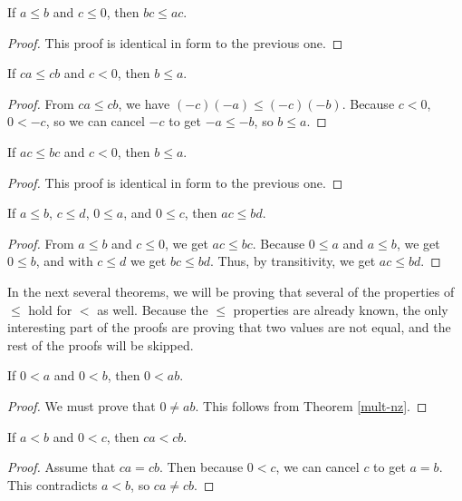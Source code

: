 \documentclass[../math.tex]{subfiles}
\begin{document}
\begin{theorem} \label{le-rmult-neg}
    If $a \leq b$ and $c \leq 0$, then $bc \leq ac$.
\end{theorem}
\begin{proof}
    This proof is identical in form to the previous one.
\end{proof}

\begin{theorem} \label{le-mult-lcancel-neg}
    If $ca \leq cb$ and $c < 0$, then $b \leq a$.
\end{theorem}
\begin{proof}
    From $ca \leq cb$, we have $(-c)(-a) \leq (-c)(-b)$.  Because $c < 0$, $0 <
    -c$, so we can cancel $-c$ to get $-a \leq -b$, so $b \leq a$.
\end{proof}

\begin{theorem} \label{le-mult-rcancel-neg}
    If $ac \leq bc$ and $c < 0$, then $b \leq a$.
\end{theorem}
\begin{proof}
    This proof is identical in form to the previous one.
\end{proof}

\begin{theorem} \label{le-lrmult-pos}
    If $a \leq b$, $c \leq d$, $0 \leq a$, and $0 \leq c$, then $ac \leq bd$.
\end{theorem}
\begin{proof}
    From $a \leq b$ and $c \leq 0$, we get $ac \leq bc$.  Because $0 \leq a$ and
    $a \leq b$, we get $0 \leq b$, and with $c \leq d$ we get $bc \leq bd$.
    Thus, by transitivity, we get $ac \leq bd$.
\end{proof}

In the next several theorems, we will be proving that several of the properties
of $\leq$ hold for $<$ as well.  Because the $\leq$ properties are already
known, the only interesting part of the proofs are proving that two values are
not equal, and the rest of the proofs will be skipped.

\begin{theorem}
    If $0 < a$ and $0 < b$, then $0 < ab$.
\end{theorem}
\begin{proof}
    We must prove that $0 \neq ab$.  This follows from Theorem \ref{mult-nz}.
\end{proof}

\begin{theorem}
    If $a < b$ and $0 < c$, then $ca < cb$.
\end{theorem}
\begin{proof}
    Assume that $ca = cb$.  Then because $0 < c$, we can cancel $c$ to get $a =
    b$.  This contradicts $a < b$, so $ca \neq cb$.
\end{proof}
\end{document}
